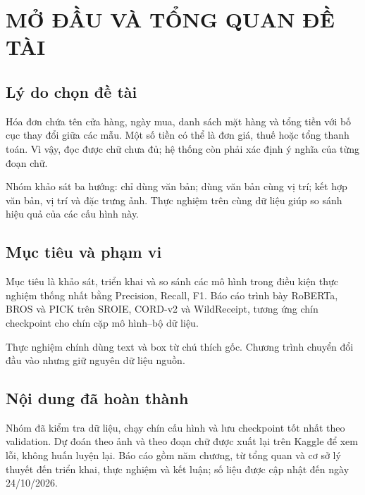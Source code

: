\chapter{MỞ ĐẦU VÀ TỔNG QUAN ĐỀ TÀI}

\section{Lý do chọn đề tài}

Hóa đơn chứa tên cửa hàng, ngày mua, danh sách mặt hàng và tổng tiền với bố cục thay đổi giữa các mẫu. Một số tiền có thể là đơn giá, thuế hoặc tổng thanh toán. Vì vậy, đọc được chữ chưa đủ; hệ thống còn phải xác định ý nghĩa của từng đoạn chữ.

Nhóm khảo sát ba hướng: chỉ dùng văn bản; dùng văn bản cùng vị trí; kết hợp văn bản, vị trí và đặc trưng ảnh. Thực nghiệm trên cùng dữ liệu giúp so sánh hiệu quả của các cấu hình này.

\section{Mục tiêu và phạm vi}

Mục tiêu là khảo sát, triển khai và so sánh các mô hình trong điều kiện thực nghiệm thống nhất bằng Precision, Recall, F1. Báo cáo trình bày RoBERTa, BROS và PICK trên SROIE, CORD-v2 và WildReceipt, tương ứng chín checkpoint cho chín cặp mô hình--bộ dữ liệu.

Thực nghiệm chính dùng text và box từ chú thích gốc. Chương trình chuyển đổi đầu vào nhưng giữ nguyên dữ liệu nguồn.

\section{Nội dung đã hoàn thành}

Nhóm đã kiểm tra dữ liệu, chạy chín cấu hình và lưu checkpoint tốt nhất theo validation. Dự đoán theo ảnh và theo đoạn chữ được xuất lại trên Kaggle để xem lỗi, không huấn luyện lại. Báo cáo gồm năm chương, từ tổng quan và cơ sở lý thuyết đến triển khai, thực nghiệm và kết luận; số liệu được cập nhật đến ngày 24/10/2026.
